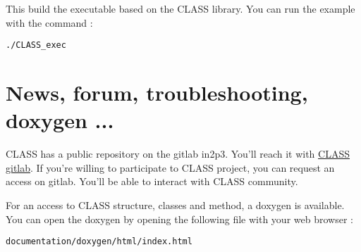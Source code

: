 This build the executable based on the CLASS library. You can run the example with the command : 

\begin{center}
\begin{minipage}{\textwidth}
\begin{lstlisting}[style=terminal]
./CLASS_exec
\end{lstlisting}
\end{minipage}
\end{center}

\chapter{News, forum, troubleshooting, doxygen ...}

CLASS has a public repository on the gitlab in2p3. You'll reach it with \href{https://gitlab.in2p3.fr/sens/CLASS}{CLASS gitlab}. If you're willing to participate to CLASS project, you can request an access on gitlab. You'll be able to interact with CLASS community.

For an access to CLASS structure, classes and method, a doxygen is available. You can open the doxygen by opening the following file with your web browser : 

\begin{center}
\begin{minipage}{\textwidth}
\begin{lstlisting}[style=terminal]
documentation/doxygen/html/index.html
\end{lstlisting}
\end{minipage}
\end{center}

